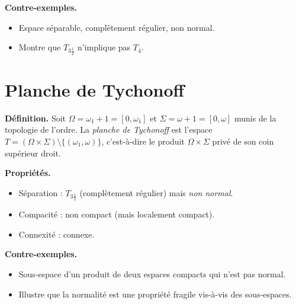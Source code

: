 \documentclass[12pt,a4paper,openany]{book}
\theoremstyle{definition}
\theoremstyle{cours}
\theoremstyle{coursnormal}
\begin{document}
\textbf{Contre-exemples.}
\begin{itemize}
  \item Espace séparable, complètement régulier, non normal.
  \item Montre que $T_{3\frac{1}{2}}$ n'implique pas $T_4$.
\end{itemize}

\section{Planche de Tychonoff}
\label{app:planche-tychonoff}

\textbf{Définition.} Soit $\Omega=\omega_1+1=[0,\omega_1]$ et
$\Sigma=\omega+1=[0,\omega]$ munis de la topologie de l'ordre.
La \emph{planche de Tychonoff} est l'espace
$T=(\Omega\times\Sigma)\setminus\{(\omega_1,\omega)\}$, c'est-à-dire
le produit $\Omega\times\Sigma$ privé de son coin supérieur droit.

\textbf{Propriétés.}
\begin{itemize}
  \item Séparation : $T_{3\frac{1}{2}}$ (complètement régulier) mais
    \emph{non normal}.
  \item Compacité : non compact (mais localement compact).
  \item Connexité : connexe.
\end{itemize}

\textbf{Contre-exemples.}
\begin{itemize}
  \item Sous-espace d'un produit de deux espaces compacts qui n'est
    pas normal.
  \item Illustre que la normalité est une propriété fragile vis-à-vis
    des sous-espaces.
\end{itemize}
\end{document}
